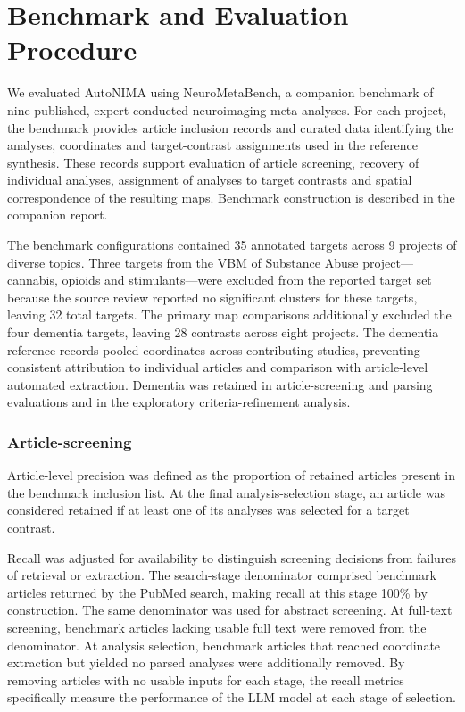 \section{Benchmark and Evaluation Procedure}

We evaluated AutoNIMA using NeuroMetaBench, a companion benchmark of nine published, expert-conducted neuroimaging meta-analyses. For each project, the benchmark provides article inclusion records and curated data identifying the analyses, coordinates and target-contrast assignments used in the reference synthesis. These records support evaluation of article screening, recovery of individual analyses, assignment of analyses to target contrasts and spatial correspondence of the resulting maps. Benchmark construction is described in the companion report.

The benchmark configurations contained 35 annotated targets across 9 projects of diverse topics. Three targets from the VBM of Substance Abuse project---cannabis, opioids and stimulants---were excluded from the reported target set because the source review reported no significant clusters for these targets, leaving 32 total targets. The primary map comparisons additionally excluded the four dementia targets, leaving 28 contrasts across eight projects. The dementia reference records pooled coordinates across contributing studies, preventing consistent attribution to individual articles and comparison with article-level automated extraction. Dementia was retained in article-screening and parsing evaluations and in the exploratory criteria-refinement analysis.

\subsubsection{Article-screening}

Article-level precision was defined as the proportion of retained articles present in the benchmark inclusion list. At the final analysis-selection stage, an article was considered retained if at least one of its analyses was selected for a target contrast.

Recall was adjusted for availability to distinguish screening decisions from failures of retrieval or extraction. The search-stage denominator comprised benchmark articles returned by the PubMed search, making recall at this stage 100\% by construction. The same denominator was used for abstract screening. At full-text screening, benchmark articles lacking usable full text were removed from the denominator. At analysis selection, benchmark articles that reached coordinate extraction but yielded no parsed analyses were additionally removed. By removing articles with no usable inputs for each stage, the recall metrics specifically measure the performance of the LLM model at each stage of selection.

